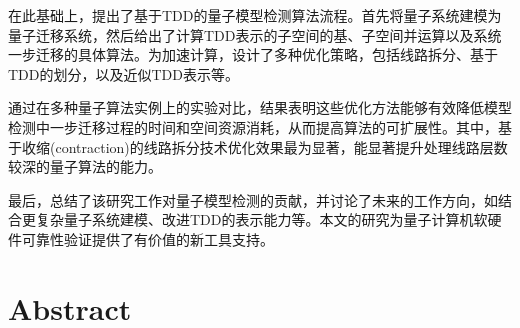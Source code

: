 在此基础上，提出了基于TDD的量子模型检测算法流程。首先将量子系统建模为量子迁移系统，然后给出了计算TDD表示的子空间的基、子空间并运算以及系统一步迁移的具体算法。为加速计算，设计了多种优化策略，包括线路拆分、基于TDD的划分，以及近似TDD表示等。

通过在多种量子算法实例上的实验对比，结果表明这些优化方法能够有效降低模型检测中一步迁移过程的时间和空间资源消耗，从而提高算法的可扩展性。其中，基于收缩(contraction)的线路拆分技术优化效果最为显著，能显著提升处理线路层数较深的量子算法的能力。

最后，总结了该研究工作对量子模型检测的贡献，并讨论了未来的工作方向，如结合更复杂量子系统建模、改进TDD的表示能力等。本文的研究为量子计算机软硬件可靠性验证提供了有价值的新工具支持。


\intobmk\chapter*{Abstract}%




